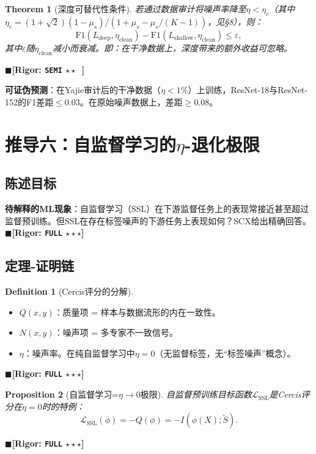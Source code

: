 \documentclass[12pt,a4paper]{ctexart}
\newtheorem{theorem}{Theorem}[section]
\newtheorem{proposition}[theorem]{Proposition}
\theoremstyle{definition}
\newtheorem{definition}{Definition}[section]
\theoremstyle{remark}
\newcommand{\rigorFull}{$\blacksquare$\;\textbf{[Rigor: \texttt{FULL} $\star\star\star$]}}
\newcommand{\rigorSemi}{$\blacksquare$\;\textbf{[Rigor: \texttt{SEMI} $\star\star\;\;$]}}
\begin{document}
\begin{theorem}[深度可替代性条件]
\label{thm:6.2}
若通过数据审计将噪声率降至$\eta < \eta_c$（其中$\eta_c = (1+\sqrt{2})(1-\mu_s)/(1+\mu_s-\mu_s/(K-1))$，见\S8），则：
\begin{equation}
\mathrm{F1}(L_{\text{deep}}, \eta_{\text{clean}}) - \mathrm{F1}(L_{\text{shallow}}, \eta_{\text{clean}}) \leq \varepsilon,
\end{equation}
其中$\varepsilon$随$\eta_{\text{clean}}$减小而衰减。即：在干净数据上，深度带来的额外收益可忽略。
\end{theorem}
\rigorSemi

\textbf{可证伪预测}：在Yajie审计后的干净数据（$\eta < 1\%$）上训练，ResNet-18与ResNet-152的F1差距$\leq 0.03$。在原始噪声数据上，差距$\geq 0.08$。

\section{推导六：自监督学习的$\eta$-退化极限}
\label{sec:ssl}

\subsection{陈述目标}
\textbf{待解释的ML现象}：自监督学习（SSL）在下游监督任务上的表现常接近甚至超过监督预训练。但SSL在存在标签噪声的下游任务上表现如何？SCX给出精确回答。
\rigorFull

\subsection{定理-证明链}

\begin{definition}[Cercis评分的分解]
\begin{itemize}
\item $Q(x, y)$：质量项 = 样本与数据流形的内在一致性。
\item $N(x, y)$：噪声项 = 多专家不一致信号。
\item $\eta$：噪声率。在纯自监督学习中$\eta = 0$（无监督标签，无``标签噪声''概念）。
\end{itemize}
\end{definition}
\rigorFull

\begin{proposition}[自监督学习=$\eta \to 0$极限]
\label{prop:13}
自监督预训练目标函数$\mathcal{L}_{\text{SSL}}$是Cercis评分在$\eta = 0$时的特例：
\begin{equation}
\mathcal{L}_{\text{SSL}}(\phi) = -Q(\phi) = -I(\phi(X); \tilde{S}).
\end{equation}
\end{proposition}
\rigorFull
\end{document}
